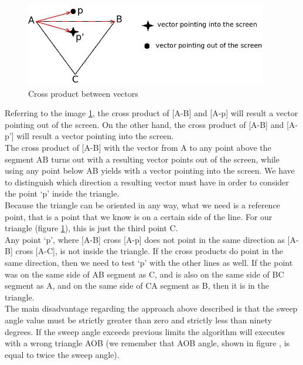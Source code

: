 \begin{figure}[!h]
  \begin{center}
    \includegraphics[width=300pt]{img/sweepal_crossproductABC.jpeg} 
    \caption{Cross product between vectors}
    \label{fig:sweepal_crossproductABC}
  \end{center}
\end{figure}

Referring to the image \ref{fig:sweepal_crossproductABC}, the cross
product of [A-B] and [A-p] will result a vector
pointing out of the screen. On the other hand, the cross product
of [A-B] and [A-p'] will result a vector pointing
into the screen.
\\
The cross product of [A-B] with the vector from A to any point above
the segment AB turns out with a resulting vector
points out of the screen, while using any point below AB yields
with a vector pointing into the screen. We have to
distinguish which direction a resulting vector must have in order to
consider the point `p' inside the triangle.
\\
Because the triangle can be oriented in any way, what we need is a
reference point, that is a point that we know is
on a certain side of the line. For our triangle (figure
\ref{fig:sweepal_crossproductABC}), this is just the third
point C.
\\
Any point `p', where [A-B] cross [A-p] does not point in the same
direction as [A-B] cross [A-C], is not inside the
triangle. If the cross products do point in the same direction, then
we need to test `p' with the other lines as well.
If the point was on the same side of AB segment as C, and is also on the
same side of BC segment as A, and on the same
side of CA segment as B, then it is in the triangle.
\\
The main disadvantage regarding the approach above described is that the
sweep angle value must be strictly greater
than zero and strictly less than ninety degrees. If the sweep angle exceeds
previous limits the algorithm will executes
with a wrong triangle AOB (we remember that AOB angle, shown in figure
, is equal to twice
the sweep angle).


